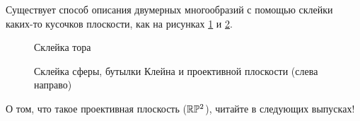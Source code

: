 Существует способ описания двумерных многообразий с помощью склейки каких-то кусочков плоскости, как на рисунках \ref{fig:c9.5} и \ref{fig:c9.6}.

\begin{figure}[ht]
    \centering
    \caption{Склейка тора}
    \label{fig:c9.5}
\end{figure}

\begin{figure}[ht]
    \centering
    \caption{Склейка сферы, бутылки Клейна и проективной плоскости (слева направо)}
    \label{fig:c9.6}
\end{figure}

О том, что такое проективная плоскость ($\mathbb{R} \mathbb{P}^2$), читайте в следующих выпусках!


